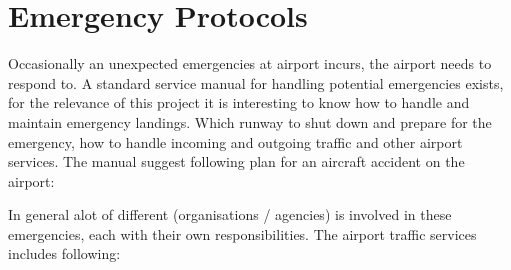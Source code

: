 \section{Emergency Protocols}

Occasionally an unexpected emergencies at airport incurs, the airport needs to respond to. A standard service manual for handling potential emergencies exists, for the relevance of this project it is interesting to know how to handle and maintain emergency landings. Which runway to shut down and prepare for the emergency, how to handle incoming and outgoing traffic and other airport services.
The manual suggest following plan for an aircraft accident on the airport:



In general alot of different (organisations / agencies) is involved in these emergencies, each with their own responsibilities. The airport traffic services includes following:

